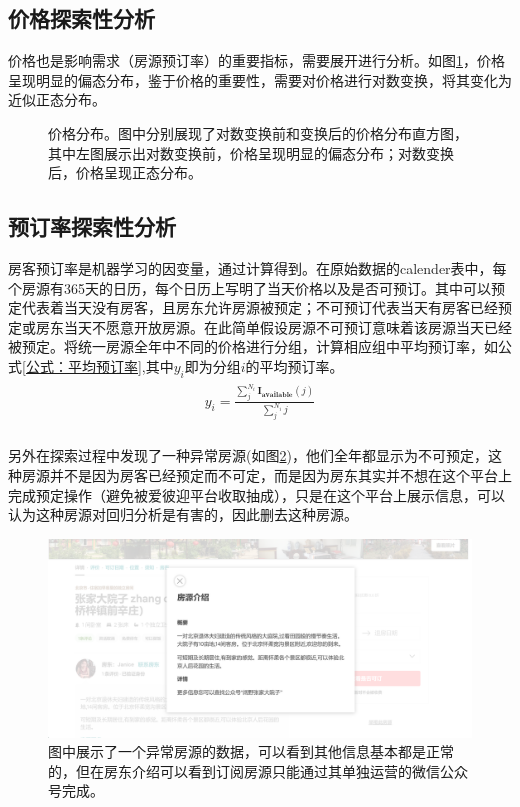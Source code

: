 \documentclass{article}
\begin{document}
\begin{multicols}{2}
\subsection{价格探索性分析}
价格也是影响需求（房源预订率）的重要指标，需要展开进行分析。如图\ref{fig:价格分布}，价格呈现明显的偏态分布，鉴于价格的重要性，需要对价格进行对数变换，将其变化为近似正态分布。
\begin{figure}
	\centering
	\caption{价格分布。图中分别展现了对数变换前和变换后的价格分布直方图，其中左图展示出对数变换前，价格呈现明显的偏态分布；对数变换后，价格呈现正态分布。}
	\label{fig:价格分布}
\end{figure}
\subsection{预订率探索性分析}
\par 房客预订率是机器学习的因变量，通过计算得到。在原始数据的calender表中，每个房源有365天的日历，每个日历上写明了当天价格以及是否可预订。其中可以预定代表着当天没有房客，且房东允许房源被预定；不可预订代表当天有房客已经预定或房东当天不愿意开放房源。在此简单假设房源不可预订意味着该房源当天已经被预定。将统一房源全年中不同的价格进行分组，计算相应组中平均预订率，如公式\ref{公式：平均预订率},其中$y_i$即为分组$i$的平均预订率。
\begin{align}\label{公式：平均预订率}
	\begin{split}
		y_i=\frac{\sum_{j}^{N_i}\mathbf{I_{available}}(j)}{\sum_{j}^{N_i}j}\\
	\end{split}
\end{align}

\par 另外在探索过程中发现了一种异常房源(如图\ref{fig:异常房源})，他们全年都显示为不可预定，这种房源并不是因为房客已经预定而不可定，而是因为房东其实并不想在这个平台上完成预定操作（避免被爱彼迎平台收取抽成），只是在这个平台上展示信息，可以认为这种房源对回归分析是有害的，因此删去这种房源。
\begin{figure}[tbph]
	\centering
	\includegraphics[width=0.8\linewidth]{figures/异常房源}
	\caption[异常房源]{图中展示了一个异常房源的数据，可以看到其他信息基本都是正常的，但在房东介绍可以看到订阅房源只能通过其单独运营的微信公众号完成。}
	\label{fig:异常房源}
\end{figure}

\end{multicols}
\end{document}
